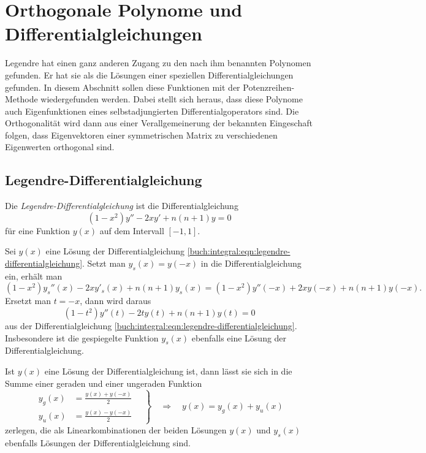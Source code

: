 %
%
%
\section{Orthogonale Polynome und Differentialgleichungen
\label{buch:orthogonal:section:orthogonale-polynome-und-dgl}}
Legendre hat einen ganz anderen Zugang zu den nach ihm benannten
Polynomen gefunden.
Er hat sie als die Lösungen einer speziellen Differentialgleichungen
gefunden.
In diesem Abschnitt sollen diese Funktionen mit der Potenzreihen-Methode
wiedergefunden werden.
Dabei stellt sich heraus, dass diese Polynome auch Eigenfunktionen eines
selbstadjungierten Differentialgoperators sind.
Die Orthogonalität wird dann aus einer Verallgemeinerung der bekannten
Eingeschaft folgen, dass Eigenvektoren einer symmetrischen Matrix zu 
verschiedenen Eigenwerten orthogonal sind.

%
%
\subsection{Legendre-Differentialgleichung}
Die {\em Legendre-Differentialgleichung} ist die Differentialgleichung
%
%
\begin{equation}
(1-x^2) y'' - 2x y' + n(n+1) y = 0
\label{buch:integral:eqn:legendre-differentialgleichung}
\end{equation}
für eine Funktion $y(x)$ auf dem Intervall $[-1,1]$.

Sei $y(x)$ eine Lösung der Differentialgleichung
\eqref{buch:integral:eqn:legendre-differentialgleichung}.
Setzt man $y_s(x)=y(-x)$ in die Differentialgleichung ein, erhält
man
\[
(1-x^2)y_s''(x) - 2x y'_s(x) + n(n+1)y_s(x)
=
(1-x^2)y''(-x) +2x y(-x) +n(n+1)y(-x).
\]
Ersetzt man $t=-x$, dann wird daraus
\[
(1-t^2)y''(t) -2t y(t) + n(n+1) y(t) = 0
\]
aus der Differentialgleichung
\eqref{buch:integral:eqn:legendre-differentialgleichung}.
Insbesondere ist die gespiegelte Funktion $y_s(x)$ ebenfalls
eine Lösung der Differentialgleichung.

Ist $y(x)$ eine Lösung der Differentialgleichung ist, dann lässt
sie sich in die Summe einer geraden und einer ungeraden Funktion
\[
\left.
\begin{aligned}
y_g(x) &= \frac{y(x)+y(-x)}{2}\\
y_u(x) &= \frac{y(x)-y(-x)}{2}
\end{aligned}
\quad
\right\}
\quad
\Rightarrow
\quad
y(x) = y_g(x) + y_u(x)
\]
zerlegen, die als Linearkombinationen der beiden Lösungen
$y(x)$ und $y_s(x)$ ebenfalls Lösungen der Differentialgleichung
sind.

